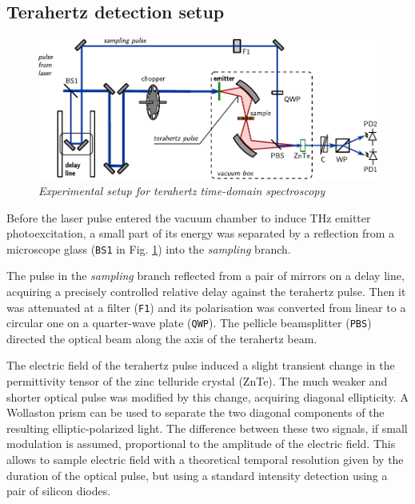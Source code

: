 \subsection{Terahertz detection setup}%

\begin{figure}[ht] \caption{\textit{Experimental setup for terahertz time-domain spectroscopy}} \label{fg_exp} \centering 
	\includegraphics[width=13cm]{img/exp_THz_sampling.pdf}
\end{figure}

Before the laser pulse entered the vacuum chamber to induce THz emitter photoexcitation, a small part of its energy was separated by a reflection from a microscope glass (\texttt{BS1} in Fig. \ref{fg_exp}) into the \textit{sampling} branch. 

The pulse in the \textit{sampling} branch reflected from a pair of mirrors on a delay line, acquiring a precisely controlled relative delay against the terahertz pulse. Then it was attenuated at a filter (\texttt{F1}) and its polarisation was converted from linear to a circular one on a quarter-wave plate (\texttt{QWP}). The pellicle beamsplitter (\texttt{PBS}) directed the optical beam along the axis of the terahertz beam. 

The electric field of the terahertz pulse induced a slight transient change in the permittivity tensor of the zinc telluride crystal (ZnTe). The much weaker and shorter optical pulse was modified by this change, acquiring diagonal ellipticity. A Wollaston prism can be used to separate the two diagonal components of the resulting elliptic-polarized light. The difference between these two signals, if small modulation is assumed, proportional to the amplitude of the electric field. This allows to sample electric field with a theoretical temporal resolution given by the duration of the optical pulse, but using a standard intensity detection using a pair of silicon diodes.   





